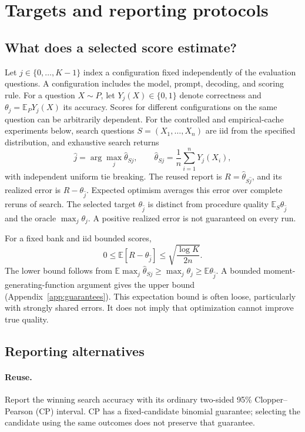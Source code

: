 \section{Targets and reporting protocols}
\label{sec:methods}
\subsection{What does a selected score estimate?}
Let $j\in\{0,\ldots,K-1\}$ index a configuration fixed independently of the evaluation questions. A configuration includes the model, prompt, decoding, and scoring rule. For a question $X\sim P$, let $Y_j(X)\in\{0,1\}$ denote correctness and $\theta_j=\mathbb{E}_P Y_j(X)$ its accuracy. Scores for different configurations on the same question can be arbitrarily dependent. For the controlled and empirical-cache experiments below, search questions $S=(X_1,\ldots,X_n)$ are iid from the specified distribution, and exhaustive search returns
\begin{equation}
 \hat j=\arg\max_j\hat\theta_{Sj},\qquad
 \hat\theta_{Sj}=\frac1n\sum_{i=1}^nY_j(X_i),
\end{equation}
with independent uniform tie breaking. The reused report is $R=\hat\theta_{S\hat j}$, and its realized error is $R-\theta_{\hat j}$. Expected optimism averages this error over complete reruns of search. The selected target $\theta_{\hat j}$ is distinct from procedure quality $\mathbb{E}_S\theta_{\hat j}$ and the oracle $\max_j\theta_j$. A positive realized error is not guaranteed on every run.

For a fixed bank and iid bounded scores,
\begin{equation}
 0\leq\mathbb{E}[R-\theta_{\hat j}]
 \leq\sqrt{\frac{\log K}{2n}}.
 \label{eq:optimism}
\end{equation}
The lower bound follows from $\mathbb{E}\max_j\hat\theta_{Sj}\geq\max_j\theta_j\geq\mathbb{E}\theta_{\hat j}$. A bounded moment-generating-function argument gives the upper bound (Appendix~\ref{app:guarantees}). This expectation bound is often loose, particularly with strongly shared errors. It does not imply that optimization cannot improve true quality.

\subsection{Reporting alternatives}
\paragraph{Reuse.}
Report the winning search accuracy with its ordinary two-sided 95\% Clopper--Pearson (CP) interval. CP has a fixed-candidate binomial guarantee; selecting the candidate using the same outcomes does not preserve that guarantee.


